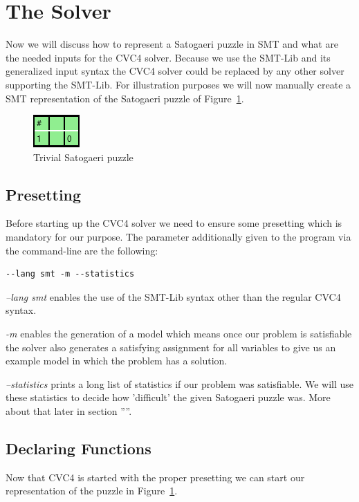 \documentclass[a4paper,10pt]{paper}
\begin{document}
\section{The Solver}
Now we will discuss how to represent a Satogaeri puzzle in SMT and what are the needed inputs for the CVC4 solver. Because we use the SMT-Lib and its generalized input syntax the CVC4 solver could be replaced by any other solver supporting the SMT-Lib. For illustration purposes we will now manually create a SMT representation of the Satogaeri puzzle of Figure~\ref{fig:solver_example}.
\begin{figure}
  \centering
  \includegraphics[scale=1]{Pictures/Solver_example.png} 
  \caption{Trivial Satogaeri puzzle}
  \label{fig:solver_example}
\end{figure}

\subsection{Presetting}
Before starting up the CVC4 solver we need to ensure some presetting which is mandatory for our purpose.
The parameter additionally given to the program via the command-line are the following:
\begin{lstlisting}
--lang smt -m --statistics
\end{lstlisting}

\emph{--lang smt} enables the use of the SMT-Lib syntax other than the regular CVC4 syntax.

\emph{-m} enables the generation of a model which means once our problem is satisfiable the solver also generates a satisfying assignment for all variables to give us an example model in which the problem has a solution.

\emph{--statistics} prints a long list of statistics if our problem was satisfiable. We will use these statistics to decide how 'difficult' the given Satogaeri puzzle was. More about that later in section ''''. 

\subsection{Declaring Functions}
Now that CVC4 is started with the proper presetting we can start our representation of the puzzle in Figure~\ref{fig:solver_example}.
\end{document}
